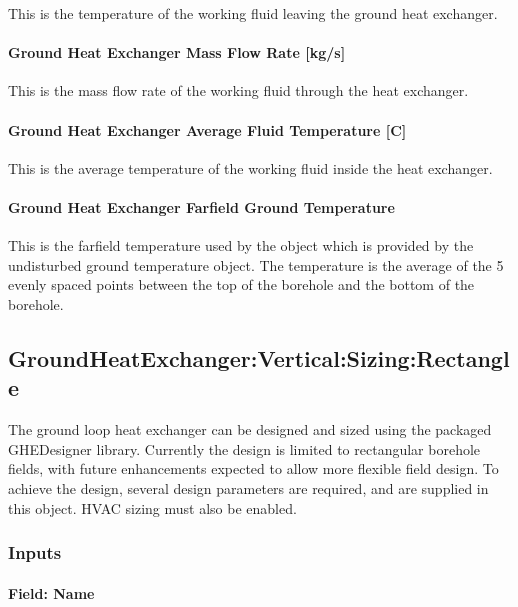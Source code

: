 This is the temperature of the working fluid leaving the ground heat exchanger.

\paragraph{Ground Heat Exchanger Mass Flow Rate {[}kg/s{]}}\label{ground-heat-exchanger-mass-flow-rate-kgs}

This is the mass flow rate of the working fluid through the heat exchanger.

\paragraph{Ground Heat Exchanger Average Fluid Temperature {[}C{]}}\label{ground-heat-exchanger-average-fluid-temperature-c}

This is the average temperature of the working fluid inside the heat exchanger.

\paragraph{Ground Heat Exchanger Farfield Ground Temperature}

This is the farfield temperature used by the object which is provided by the undisturbed ground temperature object. The temperature is the average of the 5 evenly spaced points between the top of the borehole and the bottom of the borehole.

\subsection{GroundHeatExchanger:Vertical:Sizing:Rectangle}\label{groundheatexchangerverticalsizingrect}

The ground loop heat exchanger can be designed and sized using the packaged GHEDesigner library.
Currently the design is limited to rectangular borehole fields, with future enhancements expected to allow more flexible field design.
To achieve the design, several design parameters are required, and are supplied in this object.
HVAC sizing must also be enabled.

\subsubsection{Inputs}

\paragraph{Field: Name}

